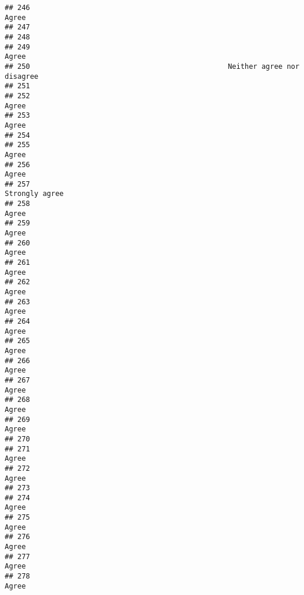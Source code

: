 \documentclass[
]{article}
\begin{document}
\begin{verbatim}
## 246                                                                    Agree
## 247                                                                         
## 248                                                                         
## 249                                                                    Agree
## 250                                               Neither agree nor disagree
## 251                                                                         
## 252                                                                    Agree
## 253                                                                    Agree
## 254                                                                         
## 255                                                                    Agree
## 256                                                                    Agree
## 257                                                           Strongly agree
## 258                                                                    Agree
## 259                                                                    Agree
## 260                                                                    Agree
## 261                                                                    Agree
## 262                                                                    Agree
## 263                                                                    Agree
## 264                                                                    Agree
## 265                                                                    Agree
## 266                                                                    Agree
## 267                                                                    Agree
## 268                                                                    Agree
## 269                                                                    Agree
## 270                                                                         
## 271                                                                    Agree
## 272                                                                    Agree
## 273                                                                         
## 274                                                                    Agree
## 275                                                                    Agree
## 276                                                                    Agree
## 277                                                                    Agree
## 278                                                                    Agree

\end{verbatim}
\end{document}
